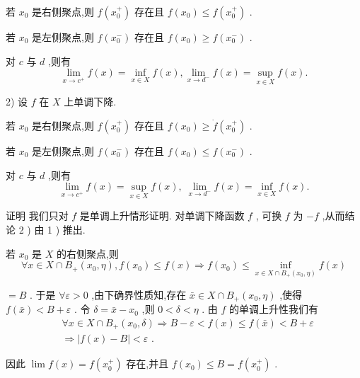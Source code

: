 若 ${x}_{0}$ 是右侧聚点,则 $f\left( {x}_{0}^{ + }\right)$ 存在且 $f\left( {x}_{0}\right)  \leq  f\left( {x}_{0}^{ + }\right)$ .

若 ${x}_{0}$ 是左侧聚点,则 $f\left( {x}_{0}^{ - }\right)$ 存在且 $f\left( {x}_{0}\right)  \geq  f\left( {x}_{0}^{ - }\right)$ .

对 $c$ 与 $d$ ,则有
$$\mathop{\lim }\limits_{{x \rightarrow  {c}^{ + }}}f\left( x\right)  = \mathop{\inf }\limits_{{x \in  X}}f\left( x\right) ,\mathop{\lim }\limits_{{x \rightarrow  {d}^{ - }}}f\left( x\right)  = \mathop{\sup }\limits_{{x \in  X}}f\left( x\right) .$$

2) 设 $f$ 在 $X$ 上单调下降.

若 ${x}_{0}$ 是右侧聚点,则 $f\left( {x}_{0}^{ + }\right)$ 存在且 $f\left( {x}_{0}\right)  \geq  \dot{f}\left( {x}_{0}^{ + }\right)$ .

若 ${x}_{0}$ 是左侧聚点,则 $f\left( {x}_{0}^{ - }\right)$ 存在且 $f\left( {x}_{0}\right)  \leq  f\left( {x}_{0}^{ - }\right)$ .

对 $c$ 与 $d$ ,则有
$$\mathop{\lim }\limits_{{x \rightarrow  {c}^{ + }}}f\left( x\right)  = \mathop{\sup }\limits_{{x \in  X}}f\left( x\right) ,\;\mathop{\lim }\limits_{{x \rightarrow  {d}^{ - }}}f\left( x\right)  = \mathop{\inf }\limits_{{x \in  X}}f\left( x\right) .$$

证明 我们只对 $f$ 是单调上升情形证明. 对单调下降函数 $f$ , 可换 $f$ 为 $- f$ ,从而结论 2 ) 由 1 ) 推出.

若 ${x}_{0}$ 是 $X$ 的右侧聚点,则
$$\forall x \in  X \cap  {B}_{ + }\left( {{x}_{0},\eta }\right) ,f\left( {x}_{0}\right)  \leq  f\left( x\right)  \Rightarrow  f\left( {x}_{0}\right)  \leq  \mathop{\inf }\limits_{{x \in  X \cap  {B}_{ + }\left( {{x}_{0},\eta }\right) }}f\left( x\right)$$

$= B$ . 于是 $\forall \varepsilon  > 0$ ,由下确界性质知,存在 $\bar{x} \in  X \cap  {B}_{ + }\left( {{x}_{0},\eta }\right)$ ,使得 $f\left( \bar{x}\right)  < B + \varepsilon$ . 令 $\delta  = \bar{x} - {x}_{0}$ ,则 $0 < \delta  < \eta$ . 由 $f$ 的单调上升性我们有
\begin{align*}
	&\forall x \in  X \cap  {B}_{ + }\left( {{x}_{0},\delta }\right)  \Rightarrow  B - \varepsilon  < f\left( x\right)  \leq  f\left( \bar{x}\right)  < B + \varepsilon\\
	&\Rightarrow  \left| {f\left( x\right)  - B}\right|  < \varepsilon \text{ . }
\end{align*}

因此 $\lim f\left( x\right)  = f\left( {x}_{0}^{ + }\right)$ 存在,并且 $f\left( {x}_{0}\right)  \leq  B = f\left( {x}_{0}^{ + }\right)$ .


